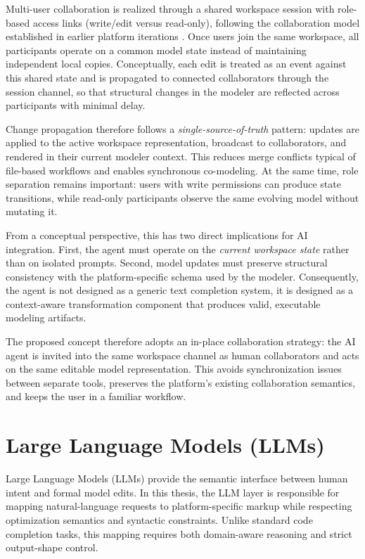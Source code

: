 Multi-user collaboration is realized through a shared workspace session with role-based access links (write/edit versus read-only), following the collaboration model established in earlier platform iterations \cite{MarkoThesisMsc, DeniThesisMsc}. Once users join the same workspace, all participants operate on a common model state instead of maintaining independent local copies. Conceptually, each edit is treated as an event against this shared state and is propagated to connected collaborators through the session channel, so that structural changes in the modeler are reflected across participants with minimal delay.

Change propagation therefore follows a \emph{single-source-of-truth} pattern: updates are applied to the active workspace representation, broadcast to collaborators, and rendered in their current modeler context. This reduces merge conflicts typical of file-based workflows and enables synchronous co-modeling. At the same time, role separation remains important: users with write permissions can produce state transitions, while read-only participants observe the same evolving model without mutating it.

From a conceptual perspective, this has two direct implications for AI integration. First, the agent must operate on the \emph{current workspace state} rather than on isolated prompts. Second, model updates must preserve structural consistency with the platform-specific schema used by the modeler. Consequently, the agent is not designed as a generic text completion system, it is designed as a context-aware transformation component that produces valid, executable modeling artifacts.

The proposed concept therefore adopts an in-place collaboration strategy: the AI agent is invited into the same workspace channel as human collaborators and acts on the same editable model representation. This avoids synchronization issues between separate tools, preserves the platform's existing collaboration semantics, and keeps the user in a familiar workflow.


\section{Large Language Models (LLMs)}
Large Language Models (LLMs) \cite{wikipediaLargeLanguage} provide the semantic interface between human intent and formal model edits. In this thesis, the LLM layer is responsible for mapping natural-language requests to platform-specific markup while respecting optimization semantics and syntactic constraints. Unlike standard code completion tasks, this mapping requires both domain-aware reasoning and strict output-shape control.

